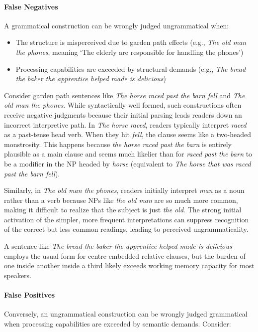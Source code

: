 \paragraph*{False Negatives}
A grammatical construction can be wrongly judged ungrammatical when:
\begin{itemize}[noitemsep]
    \item The structure is misperceived due to garden path effects (e.g., \textit{The old man the phones}, meaning `The elderly are responsible for handling the phones')
    \item Processing capabilities are exceeded by structural demands (e.g., \textit{The bread the baker the apprentice helped made is delicious})
\end{itemize}

Consider garden path sentences like \textit{The horse raced past the barn fell} and \textit{The old man the phones}. While syntactically well formed, such constructions often receive negative judgments because their initial parsing leads readers down an incorrect interpretive path. In \textit{The horse raced}, readers typically interpret \textit{raced} as a past-tense head verb. When they hit \textit{fell}, the clause seems like a two-headed monstrosity. This happens because \textit{the horse raced past the barn} is entirely plausible as a main clause and seems much likelier than for \textit{raced past the barn} to be a modifier in the NP headed by \textit{horse} (equivalent to \textit{The horse that was raced past the barn fell}).

Similarly, in \textit{The old man the phones}, readers initially interpret \textit{man} as a noun rather than a verb because NPs like \textit{the old man} are so much more common, making it difficult to realize that the subject is just \textit{the old}. The strong initial activation of the simpler, more frequent interpretations can suppress recognition of the correct but less common readings, leading to perceived ungrammaticality.

A sentence like \textit{The bread the baker the apprentice helped made is delicious} employs the usual form for centre-embedded relative clauses, but the burden of one inside another inside a third likely exceeds working memory capacity for most speakers.

\paragraph*{False Positives}
Conversely, an ungrammatical construction can be wrongly judged grammatical when processing capabilities are exceeded by semantic demands. Consider:
\z


